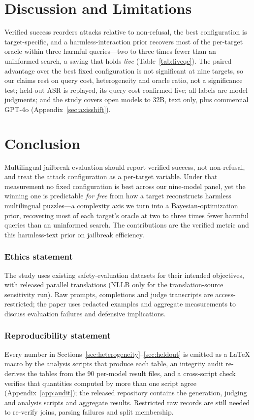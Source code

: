 \documentclass{article}
\begin{document}
\section{Discussion and Limitations}
\label{sec:discussion}
Verified success reorders attacks relative to non-refusal, the best configuration is target-specific, and a harmless-interaction prior recovers most of the per-target oracle within three harmful queries---two to three times fewer than an uninformed search, a saving that holds \emph{live} (Table~\ref{tab:liveqe}). The paired advantage over the best fixed configuration is not significant at nine targets, so our claims rest on query cost, heterogeneity and oracle ratio, not a significance test; held-out ASR is replayed, its query cost confirmed live; all labels are model judgments; and the study covers open models to 32B, text only, plus commercial GPT-4o (Appendix~\ref{sec:axisshift}).

\section{Conclusion}
Multilingual jailbreak evaluation should report verified success, not non-refusal, and treat the attack configuration as a per-target variable. Under that measurement no fixed configuration is best across our nine-model panel, yet the winning one is predictable \emph{for free} from how a target reconstructs harmless multilingual puzzles---a complexity axis we turn into a Bayesian-optimization prior, recovering most of each target's oracle at two to three times fewer harmful queries than an uninformed search. The contributions are the verified metric and this harmless-text prior on jailbreak efficiency.

\subsubsection*{Ethics statement}
The study uses existing safety-evaluation datasets for their intended objectives, with released
parallel translations (NLLB only for the translation-source sensitivity run). Raw prompts,
completions and judge transcripts are access-restricted; the paper uses redacted examples and
aggregate measurements to discuss evaluation failures and defensive implications.

\subsubsection*{Reproducibility statement}
Every number in Sections~\ref{sec:heterogeneity}--\ref{sec:heldout} is emitted as a LaTeX macro by
the analysis scripts that produce each table, an integrity audit re-derives the tables from the 90
per-model result files, and a cross-script check verifies that quantities computed by more than one
script agree (Appendix~\ref{app:audit}); the released repository contains the generation, judging and
analysis scripts and aggregate results. Restricted raw records are still needed to re-verify joins,
parsing failures and split membership.
\end{document}
